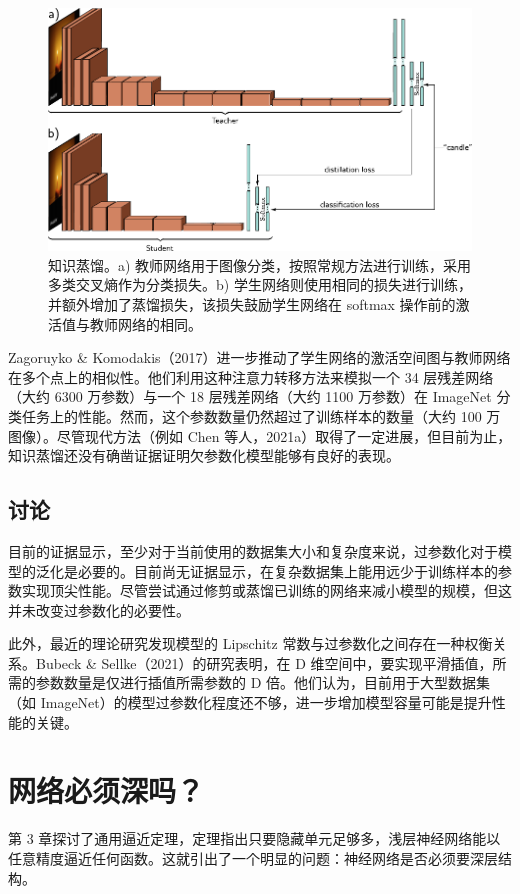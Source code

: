 \documentclass[lang=cn,newtx,10pt,scheme=chinese]{elegantbook}
\begin{document}
\begin{figure}[ht!]
\centering
\includegraphics[width=0.7\linewidth]{PDFFigures/UDLChap21PDF/WhyDistill.pdf}
\caption{知识蒸馏。a) 教师网络用于图像分类，按照常规方法进行训练，采用多类交叉熵作为分类损失。b) 学生网络则使用相同的损失进行训练，并额外增加了蒸馏损失，该损失鼓励学生网络在 softmax 操作前的激活值与教师网络的相同。}
\end{figure}

Zagoruyko \& Komodakis（2017）进一步推动了学生网络的激活空间图与教师网络在多个点上的相似性。他们利用这种注意力转移方法来模拟一个 34 层残差网络（大约 6300 万参数）与一个 18 层残差网络（大约 1100 万参数）在 ImageNet 分类任务上的性能。然而，这个参数数量仍然超过了训练样本的数量（大约 100 万图像）。尽管现代方法（例如 Chen 等人，2021a）取得了一定进展，但目前为止，知识蒸馏还没有确凿证据证明欠参数化模型能够有良好的表现。

\subsection{讨论}
目前的证据显示，至少对于当前使用的数据集大小和复杂度来说，过参数化对于模型的泛化是必要的。目前尚无证据显示，在复杂数据集上能用远少于训练样本的参数实现顶尖性能。尽管尝试通过修剪或蒸馏已训练的网络来减小模型的规模，但这并未改变过参数化的必要性。

此外，最近的理论研究发现模型的 Lipschitz 常数与过参数化之间存在一种权衡关系。Bubeck \& Sellke（2021）的研究表明，在 D 维空间中，要实现平滑插值，所需的参数数量是仅进行插值所需参数的 D 倍。他们认为，目前用于大型数据集（如 ImageNet）的模型过参数化程度还不够，进一步增加模型容量可能是提升性能的关键。


\section{网络必须深吗？}
第 3 章探讨了通用逼近定理，定理指出只要隐藏单元足够多，浅层神经网络能以任意精度逼近任何函数。这就引出了一个明显的问题：神经网络是否必须要深层结构。
\end{document}
